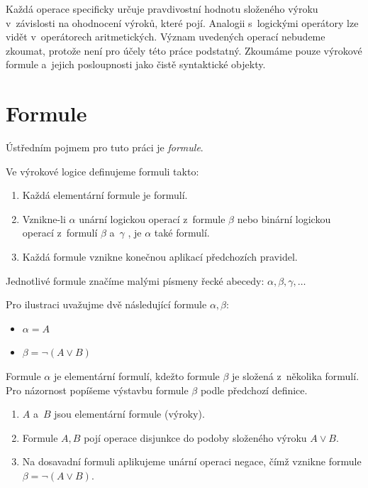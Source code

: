 \documentclass[thesis=B,czech,hidelinks]{thesis}[2012/06/26]
\begin{document}
Každá operace specificky určuje pravdivostní hodnotu složeného výroku v~závislosti na ohodnocení výroků, které pojí. Analogii s~logickými operátory lze vidět v~operátorech aritmetických. Význam uvedených operací nebudeme zkoumat, protože není pro účely této práce podstatný. Zkoumáme pouze výrokové formule a~jejich posloupnosti jako čistě syntaktické objekty.

\section{Formule}

Ústředním pojmem pro tuto práci je \emph{formule}.

\begin{dfn}
Ve výrokové logice definujeme formuli takto\cite{sochor}:
\begin{enumerate}
	\item Každá elementární formule je formulí.
	\item Vznikne-li $\alpha$ unární logickou operací z~formule $\beta$ nebo binární logickou operací z~formulí $\beta$ a~$\gamma$ , je $\alpha$ také formulí.
	\item Každá formule vznikne konečnou aplikací předchozích pravidel.
\end{enumerate}
\end{dfn}

Jednotlivé formule značíme malými písmeny řecké abecedy: $\alpha , \beta , \gamma , \ldots$

\begin{exm}
Pro ilustraci uvažujme dvě následující formule $\alpha, \beta$:
\begin{itemize}
	\item $\alpha = A$
	\item $\beta = \neg (A \vee B)$
\end{itemize}
Formule $\alpha$ je elementární formulí, kdežto formule $\beta$ je složená z~několika formulí. Pro názornost popíšeme výstavbu formule $\beta$ podle předchozí definice.
\begin{enumerate}
	\item $A$ a~$B$ jsou elementární formule (výroky).
	\item Formule $A, B$ pojí operace disjunkce do podoby složeného výroku $A \vee B$.
	\item Na dosavadní formuli aplikujeme unární operaci negace, čímž vznikne formule $\beta = \neg (A \vee B)$.
\end{enumerate}
\end{exm}
\end{document}
